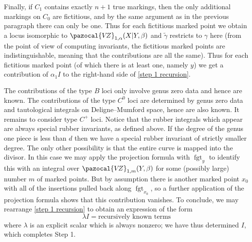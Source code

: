 \documentclass[11pt]{amsart}
\newcommand{\VZ}{\pazocal{V\!Z}}
\newcommand{\fgt}{\operatorname{fgt}}
\theoremstyle{definition}
\theoremstyle{definition}
\begin{document}
Finally, if $C_1$ contains exactly $n+1$ true markings, then the only additional markings on $C_0$ are fictitious, and by the same argument as in the previous paragraph there can only be one. Thus for each fictitious marked point we obtain a locus isomorphic to $\VZ_{1,\alpha}(X|Y,\beta)$ and $\tilde\gamma$ restricts to $\gamma$ here (from the point of view of computing invariants, the fictitious marked points are indistinguishable, meaning that the contributions are all the same). Thus for each fictitious marked point (of which there is at least one, namely $y$) we get a contribution of $\alpha_1 I$ to the right-hand side of \eqref{step 1 recursion}.

The contributions of the type $B$ loci only involve genus zero data and hence are known. The contributions of the type $C^0$ loci are determined by genus zero data and tautological integrals on Deligne--Mumford space, hence are also known. It remains to consider type $C^+$ loci. Notice that the rubber integrals which appear are always special rubber invariants, as defined above. If the degree of the genus one piece is less than $d$ then we have a special rubber invariant of strictly smaller degree. The only other possibility is that the entire curve is mapped into the divisor. In this case we may apply the projection formula with $\fgt_y$ to identify this with an integral over $\VZ_{1,m}(Y,\beta)$ for some (possibly large) number $m$ of marked points. But by assumption there is another marked point $x_0$ with all of the insertions pulled back along $\fgt_{x_0}$, so a further application of the projection formula shows that this contribution vanishes. To conclude, we may rearrange \eqref{step 1 recursion} to obtain an expression of the form
\begin{equation*} \lambda I = \text{recursively known terms} \end{equation*}
where $\lambda$ is an explicit scalar which is always nonzero; we have thus determined $I$, which completes Step 1.
\end{document}
